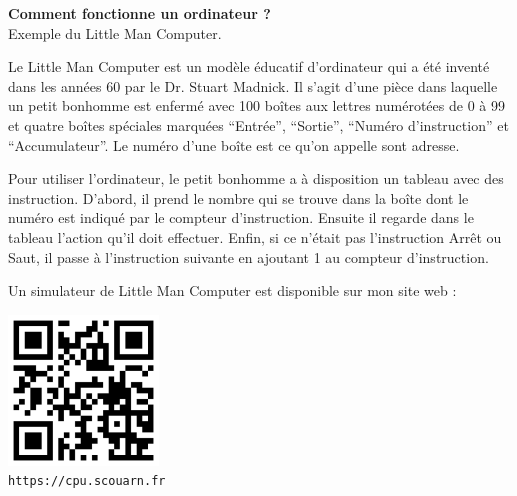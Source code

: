 \documentclass[12pt]{article}
\begin{document}
\sffamily

\begin{center}
    \LARGE\textbf{Comment fonctionne un ordinateur ?} \\
    \large Exemple du Little Man Computer.
\end{center}

\normalsize
Le Little Man Computer est un modèle éducatif d'ordinateur qui a été inventé dans les années 60 par le Dr. Stuart Madnick.
Il s'agit d'une pièce dans laquelle un petit bonhomme est enfermé avec 100 boîtes aux lettres
numérotées de 0 à 99 et quatre boîtes spéciales marquées \enquote{Entrée}, \enquote{Sortie}, \enquote{Numéro d'instruction} et \enquote{Accumulateur}.
Le numéro d'une boîte est ce qu'on appelle sont adresse.
\par
Pour utiliser l'ordinateur, le petit bonhomme a à disposition un tableau avec des instruction.
D'abord, il prend le nombre qui se trouve dans la boîte dont le numéro est indiqué par le compteur d'instruction.
Ensuite il regarde dans le tableau l'action qu'il doit effectuer.
Enfin, si ce n'était pas l'instruction Arrêt ou Saut, il passe à l'instruction suivante en ajoutant 1 au compteur d'instruction.


\vfill\par
Un simulateur de Little Man Computer est disponible sur mon site web :

\begin{center}
\includegraphics[width=4.0cm]{figures/qrcode.png}\\
\texttt{https://cpu.scouarn.fr}
\end{center}


\vfill
\end{document}
